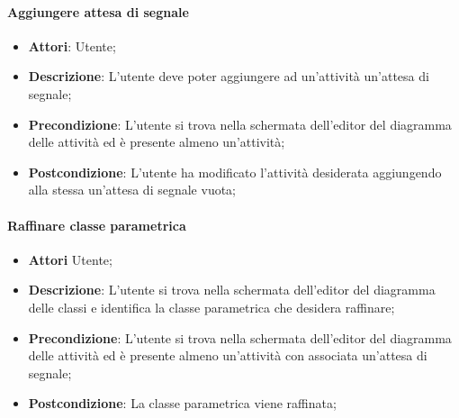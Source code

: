 \paragraph{Aggiungere attesa di segnale}
\begin{itemize}
	\item \textbf{Attori}: Utente;
	\item \textbf{Descrizione}: L'utente deve poter aggiungere ad un'attività un'attesa di segnale;
	\item \textbf{Precondizione}: L'utente si trova nella schermata dell'editor del diagramma delle attività ed è presente almeno un'attività;
	\item \textbf{Postcondizione}: L'utente ha modificato l'attività desiderata aggiungendo alla stessa un'attesa di segnale vuota;
\end{itemize}

\paragraph{Raffinare classe parametrica}
\begin{itemize}
	\item \textbf{Attori} Utente;
	\item \textbf{Descrizione}: L'utente si trova nella schermata dell'editor del diagramma delle classi e identifica la classe parametrica che desidera raffinare;
	\item \textbf{Precondizione}: L'utente si trova nella schermata dell'editor del diagramma delle attività ed è presente almeno un'attività con associata un'attesa di segnale;
	\item \textbf{Postcondizione}: La classe parametrica viene raffinata;
\end{itemize}